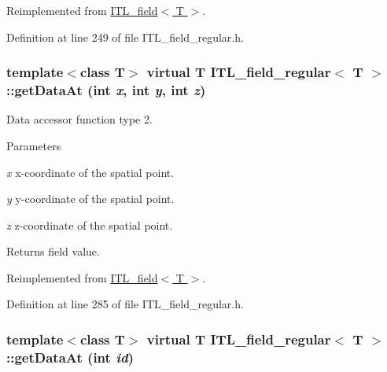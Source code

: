 Reimplemented from \hyperlink{classITL__field_a7ca32e8dd6186974778ae4c8302ee922}{ITL\_\-field$<$ T $>$}.



Definition at line 249 of file ITL\_\-field\_\-regular.h.

\hypertarget{classITL__field__regular_ad05668c219a4632a3ceaca8409339103}{
\subsubsection[{getDataAt}]{\setlength{\rightskip}{0pt plus 5cm}template$<$class T$>$ virtual T {\bf ITL\_\-field\_\-regular}$<$ T $>$::getDataAt (int {\em x}, \/  int {\em y}, \/  int {\em z})}}
\label{classITL__field__regular_ad05668c219a4632a3ceaca8409339103}


Data accessor function type 2. 


\begin{DoxyParams}{Parameters}
\item[{\em x}]x-\/coordinate of the spatial point. \item[{\em y}]y-\/coordinate of the spatial point. \item[{\em z}]z-\/coordinate of the spatial point. \end{DoxyParams}
\begin{DoxyReturn}{Returns}
field value. 
\end{DoxyReturn}


Reimplemented from \hyperlink{classITL__field_a40f9224e8815388882c953b914c540ff}{ITL\_\-field$<$ T $>$}.



Definition at line 285 of file ITL\_\-field\_\-regular.h.

\hypertarget{classITL__field__regular_a78f814d7617aeb01c63def2f5f2e9caa}{
\subsubsection[{getDataAt}]{\setlength{\rightskip}{0pt plus 5cm}template$<$class T$>$ virtual T {\bf ITL\_\-field\_\-regular}$<$ T $>$::getDataAt (int {\em id})}}
\label{classITL__field__regular_a78f814d7617aeb01c63def2f5f2e9caa}


